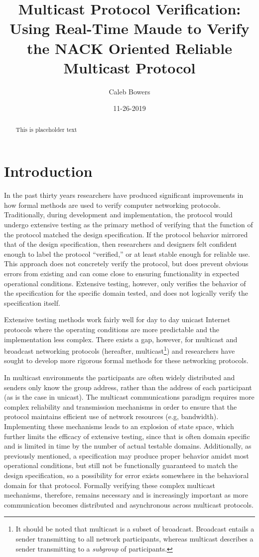 \documentclass[10pt, journal]{IEEEtran}
\title{Multicast Protocol Verification: Using Real-Time Maude to Verify the NACK Oriented Reliable Multicast Protocol}
\author{Caleb Bowers}
\date{11-26-2019}
\begin{document}
\maketitle
\begin{abstract}
This is placeholder text
\end{abstract}

\section{Introduction}
In the past thirty years researchers have produced significant improvements in how formal methods are used to verify computer networking protocols. Traditionally, during development and implementation, the protocol would undergo extensive testing as the primary method of verifying that the function of the protocol matched the design specification. If the protocol behavior mirrored that of the design specification, then researchers and designers felt confident enough to label the protocol ``verified,'' or at least stable enough for reliable use. This approach does not concretely verify the protocol, but does prevent obvious errors from existing and can come close to ensuring functionality in expected operational conditions. Extensive testing, however, only verifies the behavior of the specification for the specific domain tested, and does not logically verify the specification itself.

Extensive testing methods work fairly well for day to day unicast Internet protocols where the operating conditions are more predictable and the implementation less complex. There exists a gap, however, for multicast and broadcast networking protocols (hereafter, multicast\footnote{It should be noted that multicast is a subset of broadcast. Broadcast entails a sender transmitting to all network participants, whereas multicast describes a sender transmitting to a \textit{subgroup} of participants.}) and researchers have sought to develop more rigorous formal methods for these networking protocols. 

In multicast environments the participants are often widely distributed and senders only know the group address, rather than the address of each participant (as is the case in unicast). The multicast communications paradigm requires more complex reliability and transmission mechanisms in order to ensure that the protocol maintains efficient use of network resources (e.g, bandwidth). Implementing these mechanisms leads to an explosion of state space, which further limits the efficacy of extensive testing, since that is often domain specific and is limited in time by the number of actual testable domains. Additionally, as previously mentioned, a specification may produce proper behavior amidst most operational conditions, but still not be functionally guaranteed to match the design specification, so a possibility for error exists somewhere in the behavioral domain for that protocol. Formally verifying these complex multicast mechanisms, therefore, remains necessary and is increasingly important as more communication becomes distributed and asynchronous across multicast protocols.
\end{document}
